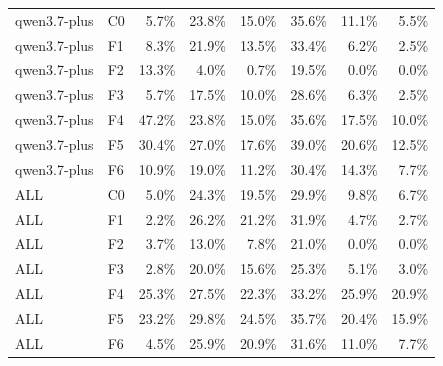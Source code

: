 \begin{tabular}{llrrrrrr}
qwen3.7-plus & C0 & 5.7\% & 23.8\% & 15.0\% & 35.6\% & 11.1\% & 5.5\% \\
qwen3.7-plus & F1 & 8.3\% & 21.9\% & 13.5\% & 33.4\% & 6.2\% & 2.5\% \\
qwen3.7-plus & F2 & 13.3\% & 4.0\% & 0.7\% & 19.5\% & 0.0\% & 0.0\% \\
qwen3.7-plus & F3 & 5.7\% & 17.5\% & 10.0\% & 28.6\% & 6.3\% & 2.5\% \\
qwen3.7-plus & F4 & 47.2\% & 23.8\% & 15.0\% & 35.6\% & 17.5\% & 10.0\% \\
qwen3.7-plus & F5 & 30.4\% & 27.0\% & 17.6\% & 39.0\% & 20.6\% & 12.5\% \\
qwen3.7-plus & F6 & 10.9\% & 19.0\% & 11.2\% & 30.4\% & 14.3\% & 7.7\% \\
ALL & C0 & 5.0\% & 24.3\% & 19.5\% & 29.9\% & 9.8\% & 6.7\% \\
ALL & F1 & 2.2\% & 26.2\% & 21.2\% & 31.9\% & 4.7\% & 2.7\% \\
ALL & F2 & 3.7\% & 13.0\% & 7.8\% & 21.0\% & 0.0\% & 0.0\% \\
ALL & F3 & 2.8\% & 20.0\% & 15.6\% & 25.3\% & 5.1\% & 3.0\% \\
ALL & F4 & 25.3\% & 27.5\% & 22.3\% & 33.2\% & 25.9\% & 20.9\% \\
ALL & F5 & 23.2\% & 29.8\% & 24.5\% & 35.7\% & 20.4\% & 15.9\% \\
ALL & F6 & 4.5\% & 25.9\% & 20.9\% & 31.6\% & 11.0\% & 7.7\% \\
\bottomrule
\end{tabular}

